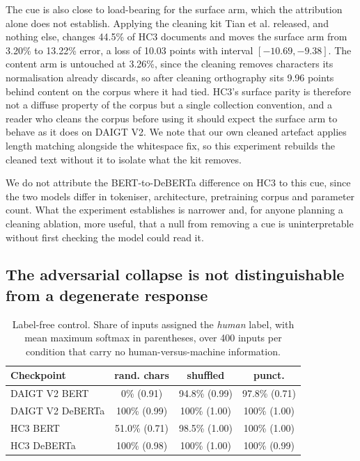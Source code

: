 The cue is also close to load-bearing for the surface arm, which the attribution alone does not establish. Applying the cleaning kit Tian et al. released, and nothing else, changes 44.5\% of HC3 documents and moves the surface arm from 3.20\% to 13.22\% error, a loss of 10.03 points with interval $[-10.69, -9.38]$. The content arm is untouched at 3.26\%, since the cleaning removes characters its normalisation already discards, so after cleaning orthography sits 9.96 points behind content on the corpus where it had tied. HC3's surface parity is therefore not a diffuse property of the corpus but a single collection convention, and a reader who cleans the corpus before using it should expect the surface arm to behave as it does on DAIGT V2. We note that our own cleaned artefact applies length matching alongside the whitespace fix, so this experiment rebuilds the cleaned text without it to isolate what the kit removes.

We do not attribute the BERT-to-DeBERTa difference on HC3 to this cue, since the two models differ in tokeniser, architecture, pretraining corpus and parameter count. What the experiment establishes is narrower and, for anyone planning a cleaning ablation, more useful, that a null from removing a cue is uninterpretable without first checking the model could read it.

\subsection{The adversarial collapse is not distinguishable from a degenerate response}
\label{sec:labelfree}

\begin{table}[!ht]
\centering
\caption{Label-free control. Share of inputs assigned the \emph{human} label, with mean maximum softmax in parentheses, over 400 inputs per condition that carry no human-versus-machine information.}
\label{tab:labelfree}
\footnotesize
\setlength{\tabcolsep}{3.5pt}
\begin{tabular}{@{}lccc@{}}
\toprule
Checkpoint & rand. chars & shuffled & punct. \\
\midrule
DAIGT V2 BERT & 0\% (0.91) & 94.8\% (0.99) & 97.8\% (0.71) \\
DAIGT V2 DeBERTa & 100\% (0.99) & 100\% (1.00) & 100\% (1.00) \\
HC3 BERT & 51.0\% (0.71) & 98.5\% (1.00) & 100\% (1.00) \\
HC3 DeBERTa & 100\% (0.98) & 100\% (1.00) & 100\% (0.99) \\
\bottomrule
\end{tabular}
\end{table}

